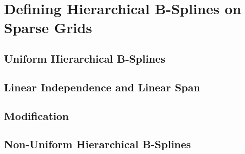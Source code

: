 \section{Defining Hierarchical B-Splines on Sparse Grids}
\label{sec:sgBspl}


\blindtext{}

\subsection{Uniform Hierarchical B-Splines}


\blindtext{}

\subsection{Linear Independence and Linear Span}


\blindtext{}

\subsection{Modification}


\blindtext{}

\subsection{Non-Uniform Hierarchical B-Splines}


\blindtext{}
